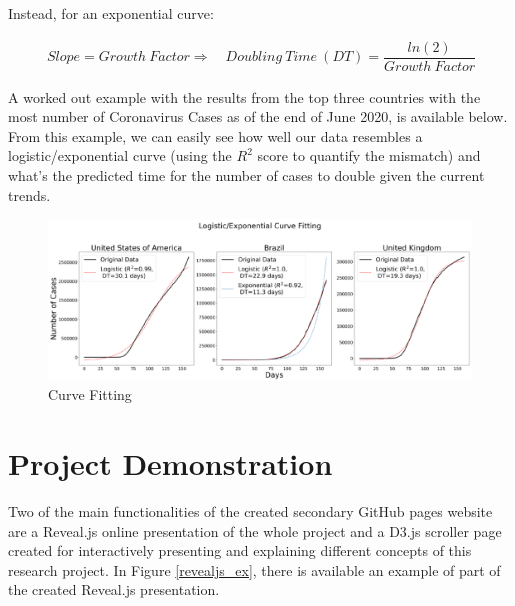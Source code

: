 \begin{appendices}
Instead, for an exponential curve:

\useshortskip
\begin{align}
\ Slope = Growth\:Factor \Rightarrow\quad Doubling\:Time\:(DT) = \dfrac{ln(2)}{Growth\:Factor}
\end{align}
\useshortskip

A worked out example with the results from the top three countries with the most number of Coronavirus Cases as of the end of June 2020, is available below. From this example, we can easily see how well our data resembles a logistic/exponential curve (using the $R^{2}$ score to quantify the mismatch) and what's the predicted time for the number of cases to double given the current trends.

\begin{figure}[ht!]%
    \centering
    \includegraphics[width=1\linewidth]{latex/images/fitting.pdf}
    \caption{Curve Fitting}
\end{figure}

\clearpage

\section{Project Demonstration}
\label{dem}

Two of the main functionalities of the created secondary GitHub pages website are a Reveal.js online presentation of the whole project and a D3.js scroller page created for interactively presenting and explaining different concepts of this research project. In Figure \ref{revealjs_ex}, there is available an example of part of the created Reveal.js presentation.


\end{appendices}
